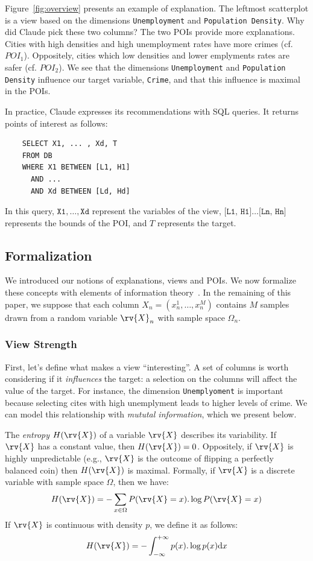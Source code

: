 Figure~\ref{fig:overview} presents an example of explanation. The leftmost
scatterplot is a view based on the dimensions \texttt{Unemployment} and
\texttt{Population Density}. Why did Claude pick these two columns? The two
POIs provide more explanations. Cities with high densities and high
unemployment rates have more crimes (cf. $POI_1$). Oppositely, cities which low
densities and lower emplyments rates are safer (cf. $POI_2$). We see that the
dimensions \texttt{Unemployment} and \texttt{Population Density} influence our
target variable, \texttt{Crime}, and that this influence is maximal in the
POIs.

In practice, Claude expresses its recommendations with SQL queries. It returns
points of interest as follows:
\begin{verbatim}
    SELECT X1, ... , Xd, T
    FROM DB
    WHERE X1 BETWEEN [L1, H1]
      AND ... 
      AND Xd BETWEEN [Ld, Hd]
\end{verbatim}
In this query, $\texttt{X1},\ldots, \texttt{Xd}$ represent the variables of the
view, $\texttt{[L1, H1]}\ldots\texttt{[Ln, Hn]}$ represents the bounds of the
POI, and $T$ represents the target.

\subsection{Formalization}
\label{sec:formalization}
We introduced our notions of explanations, views and POIs. We now formalize
these concepts with elements of information theory~\cite{cover2012elements}. In
the remaining of this paper, we suppose that each column $X_n = (x_n^1, \ldots,
x_n^M)$ contains $M$ samples drawn from a random variable $\rv{X}_n$ with
sample space $\Omega_n$.

\subsubsection{View Strength}
\label{sec:view-strength}
First, let's define what makes a view ``interesting''. A set of columns is
worth considering if it \emph{influences} the target: a selection on
the columns will affect the value of the target. For instance, the dimension
\texttt{Unemplyoment} is important because selecting cites with high
unemplyment leads to higher levels of crime. We can model this relationship
with \emph{mututal information}, which we present below.

The \emph{entropy} $H(\rv{X})$ of a variable $\rv{X}$ describes its
variability. If $\rv{X}$ has a constant value, then $H(\rv{X}) = 0$.
Oppositely, if $\rv{X}$ is highly unpredictable (e.g., $\rv{X}$ is
the outcome of flipping a perfectly balanced coin) then $H(\rv{X})$ is
maximal. Formally, if $\rv{X}$ is a discrete variable with sample space
$\Omega$, then we have:
\begin{equation}\label{eq:ent-disc}
    H(\rv{X}) = - \sum_{x\in \Omega} P(\rv{X} = x).\log{P(\rv{X} = x)}
\end{equation}
If $\rv{X}$ is continuous with density $p$, we define it as follows:
\begin{equation}\label{eq:ent-cont}
    H(\rv{X}) = - \int_{-\infty}^{+\infty} p(x).\log{p(x)}\mathrm{d}x
\end{equation}

